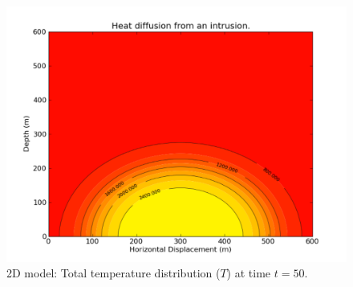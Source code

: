 \begin{figure}[h!]
\centerline{\includegraphics[width=4.in]{figures/heatrefraction050}}
\caption{2D model: Total temperature distribution ($T$) at time $t=50$.}
\label{fig:twodhdans}
\end{figure}